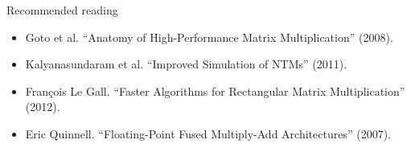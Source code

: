 \documentclass[mathserif,xcolor={dvipsnames,table}]{beamer}
\begin{document}
\begin{frame}{Recommended reading}
\tiny{
\begin{itemize}
\item Goto et al. ``Anatomy of High-Performance Matrix Multiplication'' (2008).
\item Kalyanasundaram et al. ``Improved Simulation of NTMs'' (2011).
\item Fran\c{c}ois Le Gall. ``Faster Algorithms for Rectangular Matrix Multiplication'' (2012).
\item Eric Quinnell. ``Floating-Point Fused Multiply-Add Architectures'' (2007).
\end{itemize}
}
\end{frame}

\end{document}
